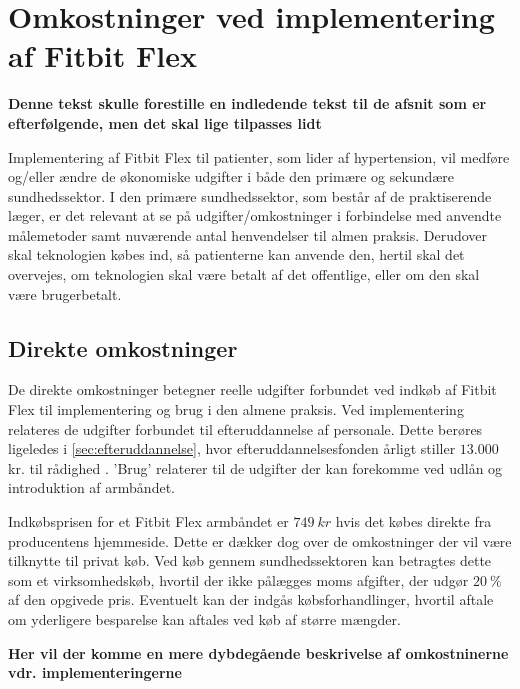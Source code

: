 
\section{Omkostninger ved implementering af Fitbit Flex}

\textbf{Denne tekst skulle forestille en indledende tekst til de afsnit som er efterfølgende, men det skal lige tilpasses lidt} 

Implementering af Fitbit Flex til patienter, som lider af hypertension, vil medføre og/eller ændre de økonomiske udgifter i både den primære og sekundære sundhedssektor. I den primære sundhedssektor, som består af de praktiserende læger, er det relevant at se på udgifter/omkostninger i forbindelse med anvendte målemetoder samt nuværende antal henvendelser til almen praksis. Derudover skal teknologien købes ind, så patienterne kan anvende den, hertil skal det overvejes, om teknologien skal være betalt af det offentlige, eller om den skal være brugerbetalt. 


\subsection{Direkte omkostninger}
De direkte omkostninger betegner reelle udgifter forbundet ved indkøb af Fitbit Flex til implementering og brug i den almene praksis.  
Ved implementering relateres de udgifter forbundet til efteruddannelse af personale. Dette berøres ligeledes i \autoref{sec:efteruddannelse}, hvor efteruddannelsesfonden årligt stiller $13.000$ kr. til rådighed \citep{vedsted2005}.  
'Brug' relaterer til de udgifter der kan forekomme ved udlån og introduktion af armbåndet. 

Indkøbsprisen for et Fitbit Flex armbåndet er $749\ kr$ hvis det købes direkte fra producentens hjemmeside. Dette er dækker dog over de omkostninger der vil være tilknytte til privat køb. 
Ved køb gennem sundhedssektoren kan betragtes dette som et virksomhedskøb, hvortil der ikke pålægges moms afgifter, der udgør $20~\%$ af den opgivede pris. 
Eventuelt kan der indgås købsforhandlinger, hvortil aftale om yderligere besparelse kan aftales ved køb af større mængder. 

 \textbf{Her vil der komme en mere dybdegående beskrivelse af omkostninerne vdr. implementeringerne}

